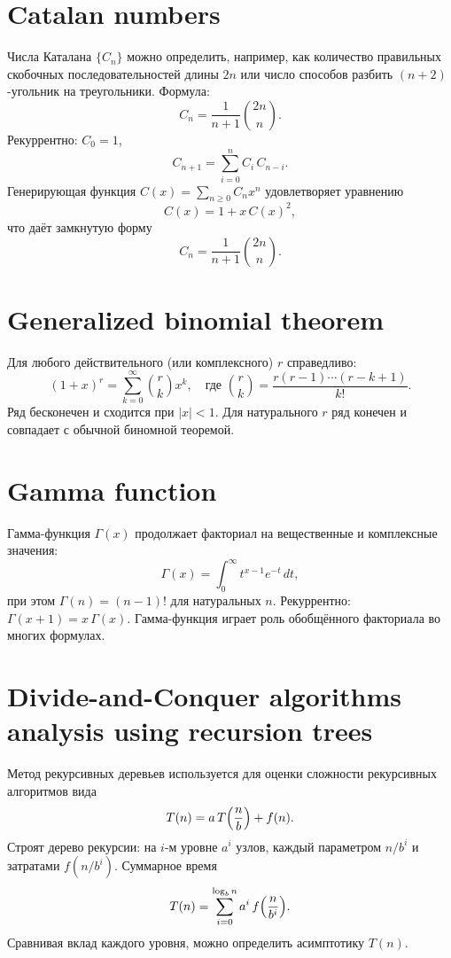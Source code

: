 \documentclass{article}
\begin{document}
	\section{Catalan numbers}
	Числа Каталана $\{C_n\}$ можно определить, например, как количество правильных скобочных последовательностей длины $2n$ или число способов разбить $(n+2)$-угольник на треугольники. Формула:
	\[
	C_n = \frac{1}{n+1}\binom{2n}{n}.
	\]
	Рекуррентно: $C_0=1$, 
	\[
	C_{n+1} = \sum_{i=0}^n C_i\,C_{n-i}.
	\]
	Генерирующая функция $C(x)=\sum_{n\ge0}C_n x^n$ удовлетворяет уравнению 
	\[
	C(x)=1 + x\,C(x)^2,
	\]
	что даёт замкнутую форму 
	\[
	C_n = \frac{1}{n+1}\binom{2n}{n}.
	\]
	
	\section{Generalized binomial theorem}
	Для любого действительного (или комплексного) $r$ справедливо:
	\[
	(1+x)^r = \sum_{k=0}^\infty \binom{r}{k} x^k, \quad \text{где } \binom{r}{k} = \frac{r(r-1)\cdots(r-k+1)}{k!}.
	\]
	Ряд бесконечен и сходится при $|x|<1$. Для натурального $r$ ряд конечен и совпадает с обычной биномной теоремой.
	
	\section{Gamma function}
	Гамма-функция $\Gamma(x)$ продолжает факториал на вещественные и комплексные значения:
	\[
	\Gamma(x) = \int_0^\infty t^{x-1} e^{-t}\,dt,
	\]
	при этом $\Gamma(n)=(n-1)!$ для натуральных $n$. Рекуррентно: $\Gamma(x+1)=x\,\Gamma(x)$. Гамма-функция играет роль обобщённого факториала во многих формулах.
	
	\section{Divide-and-Conquer algorithms analysis using recursion trees}
	Метод рекурсивных деревьев используется для оценки сложности рекурсивных алгоритмов вида 
	\[
	T(n)=a\,T\Bigl(\frac{n}{b}\Bigr) + f(n).
	\]
	Строят дерево рекурсии: на $i$-м уровне $a^i$ узлов, каждый параметром $n/b^i$ и затратами $f(n/b^i)$. Суммарное время 
	\[
	T(n)=\sum_{i=0}^{\log_b n} a^i\,f\Bigl(\frac{n}{b^i}\Bigr).
	\]
	Сравнивая вклад каждого уровня, можно определить асимптотику $T(n)$.
	
\end{document}
